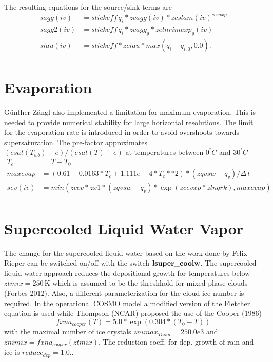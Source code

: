 \documentclass[a4paper,11pt]{article}
\begin{document}
The resulting equations for the source/sink terms are
\begin{align}
  sagg(iv)  & = stickeff \, q_i * zcagg(iv) * zcslam(iv)^{ccsaxp} \\
  sagg2(iv) & = stickeff \, q_i * zcagg_g * zelnrimexp_g(iv)\\
  siau(iv)  & = stickeff * zciau * max( q_i - q_{i,0}, 0.0).\\
\end{align}

\section{Evaporation}
G\"unther Z\"angl also implemented a limitation for maximum evaporation. This
is needed to provide numerical stability for large horizontal resolutions. The
limit for the evaporation rate is introduced in order to avoid overshoots
towards supersaturation. The pre-factor approximates
$(esat(T_{wb})-e)/(esat(T)-e)$ at temperatures between $0^{°}C$ and $30^{°}C$
\begin{align}
 T_c &=T - T_0 \\
 maxevap& =(0.61-0.0163*T_c+1.111e-4*T_c**2)*(zqvsw-q_v)/\Delta \,t \\
sev(iv) &= min(zcev*zx1*(zqvsw - q_v) * \exp(zcevxp * zlnqrk), maxevap)\\
\end{align}

\section{Supercooled Liquid Water Vapor}
The change for the supercooled liquid water based on the work done by Felix
Rieper can be switched on/off with the switch $\bold{lsuper\_coolw}$. The
supercooled liquid water approach reduces the depositional growth for
temperatures below $ztmix = 250\,\text{K}$ which is assumed to be the
threshhold for mixed-phase clouds (Forbes 2012). Also, a different
parameterization for the cloud ice number is required. In the operational COSMO model a modified version of
the Fletcher equation is used while Thompson (NCAR) proposed the use of the
Cooper (1986) 
\begin{equation}
fxna_{cooper}(T) = 5.0 * \exp(0.304 * (T_0 - T))   
\end{equation}
with the maximal number of ice crystals  $znimax_{Thom} = 250.0e3$ and $znimix = fxna_{cooper}(ztmix)$. 
The reduction coeff. for dep. growth of rain and ice is $reduce_{dep} = 1.0.$.
\end{document}
